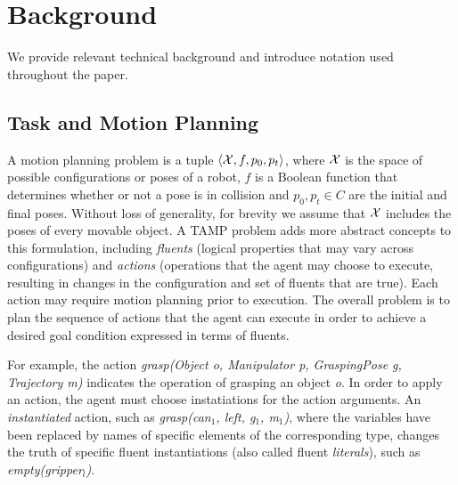\section{Background}
We provide relevant technical background and introduce notation
used throughout the paper. 

\subsection{Task and Motion Planning}

A motion planning problem is a tuple $\langle \mathcal{X}, f, p_0, p_t \rangle$, where
$\mathcal{X}$ is the space of possible configurations or poses of a robot, $f$
is a Boolean function that determines whether or not a pose is in
collision and $p_0, p_t\in C$ are the initial and final poses. Without
loss of generality, for brevity we assume that $\mathcal{X}$ includes the poses
of every movable object. A TAMP problem adds more abstract concepts
to this formulation, including \emph{fluents}
(logical properties that may vary across configurations) and
\emph{actions} (operations that the agent may choose to execute,
resulting in changes in the configuration and set of fluents that
are true). Each action may require motion planning prior to execution.
The overall problem is to plan the sequence of actions
that the agent can execute in order to achieve a desired goal
condition expressed in terms of fluents.

For example, the action \emph{grasp(Object o, Manipulator p, GraspingPose g,
  Trajectory m)} indicates the operation of grasping an object
\emph{o}.  In order to apply an action, the agent must choose
instatiations for the action arguments. An \emph{instantiated} action,
such as \emph{grasp(can$_1$, left, g$_1$, m$_1$)}, where the variables
have been replaced by names of specific elements of the corresponding
type, changes the truth of specific fluent instantiations (also called fluent
\emph{literals}), such as \emph{empty(gripper$_l$)}.

